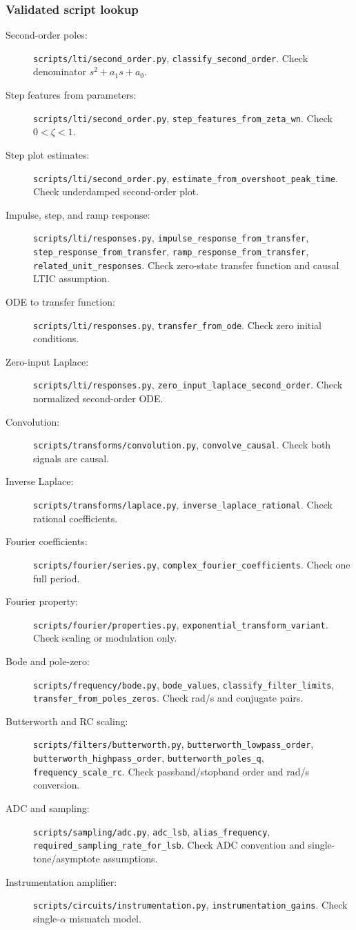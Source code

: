 \subsubsection{Validated script lookup}
\begin{description}
    \item[Second-order poles:] \texttt{scripts/lti/second\_order.py}, \texttt{classify\_second\_order}. Check denominator \(s^2+a_1s+a_0\).
    \item[Step features from parameters:] \texttt{scripts/lti/second\_order.py}, \texttt{step\_features\_from\_zeta\_wn}. Check \(0<\zeta<1\).
    \item[Step plot estimates:] \texttt{scripts/lti/second\_order.py}, \texttt{estimate\_from\_overshoot\_peak\_time}. Check underdamped second-order plot.
    \item[Impulse, step, and ramp response:] \texttt{scripts/lti/responses.py}, \texttt{impulse\_response\_from\_transfer}, \texttt{step\_response\_from\_transfer}, \texttt{ramp\_response\_from\_transfer}, \texttt{related\_unit\_responses}. Check zero-state transfer function and causal LTIC assumption.
    \item[ODE to transfer function:] \texttt{scripts/lti/responses.py}, \texttt{transfer\_from\_ode}. Check zero initial conditions.
    \item[Zero-input Laplace:] \texttt{scripts/lti/responses.py}, \texttt{zero\_input\_laplace\_second\_order}. Check normalized second-order ODE.
    \item[Convolution:] \texttt{scripts/transforms/convolution.py}, \texttt{convolve\_causal}. Check both signals are causal.
    \item[Inverse Laplace:] \texttt{scripts/transforms/laplace.py}, \texttt{inverse\_laplace\_rational}. Check rational coefficients.
    \item[Fourier coefficients:] \texttt{scripts/fourier/series.py}, \texttt{complex\_fourier\_coefficients}. Check one full period.
    \item[Fourier property:] \texttt{scripts/fourier/properties.py}, \texttt{exponential\_transform\_variant}. Check scaling or modulation only.
    \item[Bode and pole-zero:] \texttt{scripts/frequency/bode.py}, \texttt{bode\_values}, \texttt{classify\_filter\_limits}, \texttt{transfer\_from\_poles\_zeros}. Check rad/s and conjugate pairs.
    \item[Butterworth and RC scaling:] \texttt{scripts/filters/butterworth.py}, \texttt{butterworth\_lowpass\_order}, \texttt{butterworth\_highpass\_order}, \texttt{butterworth\_poles\_q}, \texttt{frequency\_scale\_rc}. Check passband/stopband order and rad/s conversion.
    \item[ADC and sampling:] \texttt{scripts/sampling/adc.py}, \texttt{adc\_lsb}, \texttt{alias\_frequency}, \texttt{required\_sampling\_rate\_for\_lsb}. Check ADC convention and single-tone/asymptote assumptions.
    \item[Instrumentation amplifier:] \texttt{scripts/circuits/instrumentation.py}, \texttt{instrumentation\_gains}. Check single-\(\alpha\) mismatch model.
\end{description}
